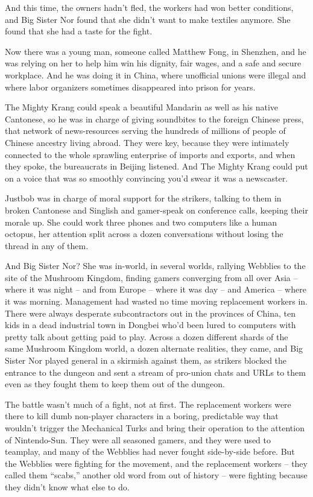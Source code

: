 And this time, the owners hadn't fled, the workers had won better
conditions, and Big Sister Nor found that she didn't want to make
textiles anymore. She found that she had a taste for the fight.

Now there was a young man, someone called Matthew Fong, in
Shenzhen, and he was relying on her to help him win his dignity,
fair wages, and a safe and secure workplace. And he was doing it in
China, where unofficial unions were illegal and where labor
organizers sometimes disappeared into prison for years.

The Mighty Krang could speak a beautiful Mandarin as well as his
native Cantonese, so he was in charge of giving soundbites to the
foreign Chinese press, that network of news-resources serving the
hundreds of millions of people of Chinese ancestry living abroad.
They were key, because they were intimately connected to the whole
sprawling enterprise of imports and exports, and when they spoke,
the bureaucrats in Beijing listened. And The Mighty Krang could put
on a voice that was so smoothly convincing you'd swear it was a
newscaster.

Justbob was in charge of moral support for the strikers, talking to
them in broken Cantonese and Singlish and gamer-speak on conference
calls, keeping their morale up. She could work three phones and two
computers like a human octopus, her attention split across a dozen
conversations without losing the thread in any of them.

And Big Sister Nor? She was in-world, in several worlds, rallying
Webblies to the site of the Mushroom Kingdom, finding gamers
converging from all over Asia -- where it was night -- and from
Europe -- where it was day -- and America -- where it was morning.
Management had wasted no time moving replacement workers in. There
were always desperate subcontractors out in the provinces of China,
ten kids in a dead industrial town in Dongbei who'd been lured to
computers with pretty talk about getting paid to play. Across a
dozen different shards of the same Mushroom Kingdom world, a dozen
alternate realities, they came, and Big Sister Nor played general
in a skirmish against them, as strikers blocked the entrance to the
dungeon and sent a stream of pro-union chats and URLs to them even
as they fought them to keep them out of the dungeon.

The battle wasn't much of a fight, not at first. The replacement
workers were there to kill dumb non-player characters in a boring,
predictable way that wouldn't trigger the Mechanical Turks and
bring their operation to the attention of Nintendo-Sun. They were
all seasoned gamers, and they were used to teamplay, and many of
the Webblies had never fought side-by-side before. But the Webblies
were fighting for the movement, and the replacement workers -- they
called them ``scabs,'' another old word from out of history -- were
fighting because they didn't know what else to do.

